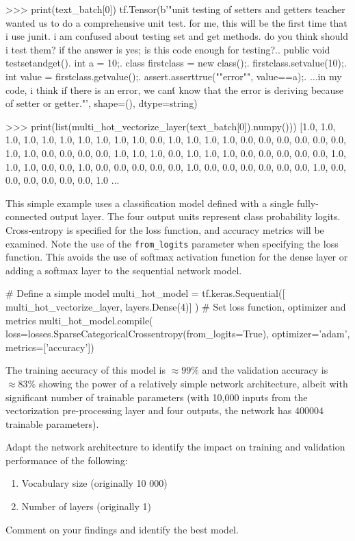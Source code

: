\begin{withcode}
\begin{textcode}
>>> print(text_batch[0])
tf.Tensor(b'"unit testing of setters and getters teacher wanted us 
to do a comprehensive unit test. for me, this will be the first time 
that i use junit. i am confused about testing set and get methods. 
do you think should i test them? if the answer is yes; is this code 
enough for testing?..  public void testsetandget(){.    int a = 10;.    
class firstclass = new class();.    firstclass.setvalue(10);.    int
value = firstclass.getvalue();.    assert.asserttrue(""error"", 
value==a);.  }...in my code, i think if there is an error, we can\'t
know that the error is deriving because of setter or getter."\n', 
shape=(), dtype=string)

>>> print(list(multi_hot_vectorize_layer(text_batch[0]).numpy()))
[1.0, 1.0, 1.0, 1.0, 1.0, 1.0, 1.0, 1.0, 1.0, 1.0, 0.0, 1.0, 1.0, 
1.0, 1.0, 0.0, 0.0, 0.0, 0.0, 0.0, 0.0, 1.0, 1.0, 0.0, 0.0, 0.0, 
0.0, 1.0, 1.0, 1.0, 0.0, 1.0, 1.0, 1.0, 0.0, 0.0, 0.0, 0.0, 0.0, 
1.0, 1.0, 1.0, 0.0, 0.0, 1.0, 0.0, 0.0, 0.0, 0.0, 0.0, 1.0, 0.0, 
0.0, 0.0, 0.0, 0.0, 0.0, 1.0, 0.0, 0.0, 0.0, 0.0, 0.0, 0.0, 1.0
...
\end{textcode}

This simple example uses a classification model defined with a single fully-connected output layer. The four output units represent class probability logits. Cross-entropy is specified for the loss function, and accuracy metrics will be examined. Note the use of the \texttt{from\_logits} parameter when specifying the loss function. This avoids the use of softmax activation function for the dense layer or adding a softmax layer to the sequential network model.

\begin{pythoncode}
# Define a simple model
multi_hot_model = tf.keras.Sequential([
    multi_hot_vectorize_layer,
    layers.Dense(4)]
)
# Set loss function, optimizer and metrics
multi_hot_model.compile(
    loss=losses.SparseCategoricalCrossentropy(from_logits=True),
    optimizer='adam', metrics=['accuracy'])
\end{pythoncode}

The training accuracy of this model is $\approx 99\%$ and the validation accuracy is $\approx 83\%$ showing the power of a relatively simple network architecture, albeit with significant number of trainable parameters (with 10,000 inputs from the vectorization pre-processing layer and four outputs, the network has 400004 trainable parameters).

\begin{exerciseboxcomputer}

Adapt the network architecture to identify the impact on training and validation performance of the following:
   \begin{enumerate}
      \item Vocabulary size (originally 10 000)
      \item Number of layers (originally 1)
   \end{enumerate}
Comment on your findings and identify the best model.
\end{exerciseboxcomputer}
\end{withcode}

